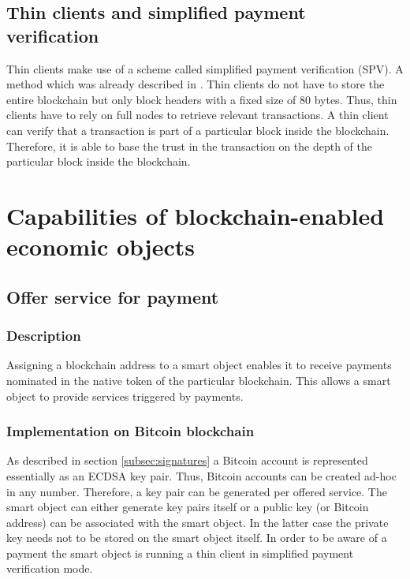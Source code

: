 \documentclass[10pt, conference,compsoc]{IEEEtran}
\begin{document}
  \subsection{Thin clients and simplified payment verification}
  \label{subsec:spv}

  Thin clients make use of a scheme called simplified payment verification (SPV). A method which was already described in \cite{nakamoto2008bitcoin}. Thin clients do not have to store the entire blockchain but only block headers with a fixed size of 80 bytes. Thus, thin clients have to rely on full nodes to retrieve relevant transactions. A thin client can verify that a transaction is part of a particular block inside the blockchain. Therefore, it is able to base the trust in the transaction on the depth of the particular block inside the blockchain. 

\section{Capabilities of blockchain-enabled economic objects}
\label{economicObjects}

\subsection{Offer service for payment}

\subsubsection{Description} Assigning a blockchain address to a smart object enables it to receive payments nominated in the native token of the particular blockchain. This allows a smart object to provide services triggered by payments.

\subsubsection{Implementation on Bitcoin blockchain}
\label{subsubsec:offerserviceimp}

As described in section \ref{subsec:signatures} a Bitcoin account is represented essentially as an ECDSA key pair. Thus, Bitcoin accounts can be created ad-hoc in any number. Therefore, a key pair can be generated per offered service. The smart object can either generate key pairs itself or a public key (or Bitcoin address) can be associated with the smart object. In the latter case the private key needs not to be stored on the smart object itself. In order to be aware of a payment the smart object is running a thin client in simplified payment verification mode.
\end{document}
